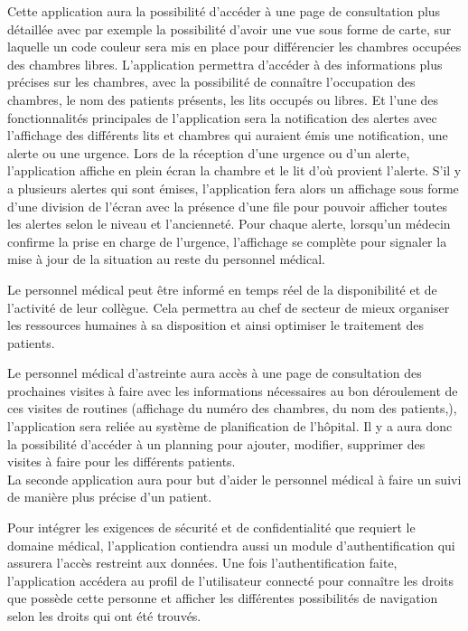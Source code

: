 Cette application aura la possibilité d’accéder à une page de consultation plus détaillée avec par exemple la possibilité d’avoir une vue sous forme de carte, sur laquelle un code couleur sera mis en place pour différencier les chambres occupées des chambres libres. L’application permettra d’accéder à des informations plus précises sur les chambres, avec la possibilité de connaître l’occupation des chambres, le nom des patients présents, les lits occupés ou libres. Et l’une des fonctionnalités principales de l’application sera la notification des alertes avec l’affichage des différents lits et chambres qui auraient émis une notification, une alerte ou une urgence. Lors de la réception d’une urgence ou d’un alerte, l’application affiche en plein écran la chambre et le lit d’où provient l’alerte. S’il y a plusieurs alertes qui sont émises, l’application fera alors un affichage sous forme d’une division de l’écran avec la présence d’une file pour pouvoir afficher toutes les alertes selon le niveau et l’ancienneté. Pour chaque alerte, lorsqu’un médecin confirme la prise en charge de l’urgence, l’affichage se complète pour signaler la mise à jour de la situation au reste du personnel médical.

Le personnel médical peut être informé en temps réel de la disponibilité et de l’activité de leur collègue. Cela permettra au chef de secteur de mieux organiser les ressources humaines à sa disposition et ainsi optimiser le traitement des patients.

Le personnel médical d’astreinte aura accès à une page de consultation des prochaines visites à faire avec les informations nécessaires au bon déroulement de ces visites de routines (affichage du numéro des chambres, du nom des patients,), l’application sera reliée au système de planification de l’hôpital. Il y a aura donc la possibilité d’accéder à un planning pour ajouter, modifier, supprimer des visites à faire pour les différents patients.
\\

La seconde application aura pour but d’aider le personnel médical à faire un suivi de manière plus précise d’un patient.

Pour intégrer les exigences de sécurité et de confidentialité que requiert le domaine médical, l’application contiendra aussi un module d’authentification qui assurera l’accès restreint aux données. Une fois l’authentification faite, l’application accédera au profil de l’utilisateur connecté pour connaître les droits que possède cette personne et afficher les différentes possibilités de navigation selon les droits qui ont été trouvés.

